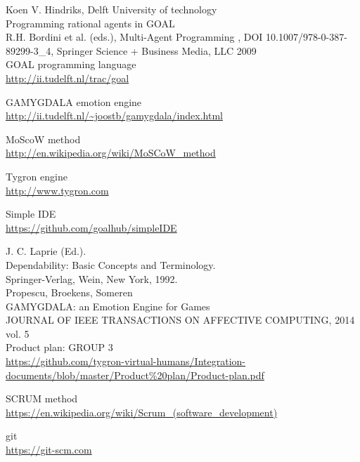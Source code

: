 \documentclass[11pt]{article}
\begin{document}
\clearpage

\printglossaries

\clearpage

\begin{thebibliography}{9}
	Koen V. Hindriks, Delft University of technology\\
	Programming rational agents in GOAL\\
	R.H. Bordini et al. (eds.), Multi-Agent Programming , DOI 10.1007/978-0-387-89299-3\_4, Springer Science + Business Media, LLC 2009 \\

	GOAL programming language\\
	\url{http://ii.tudelft.nl/trac/goal}
	
	GAMYGDALA emotion engine\\
	\url{http://ii.tudelft.nl/~joostb/gamygdala/index.html}
	
	MoScoW method\\
	\url{http://en.wikipedia.org/wiki/MoSCoW_method}
	
	Tygron engine\\
	\url{http://www.tygron.com}
	
	Simple IDE\\
	\url{https://github.com/goalhub/simpleIDE}
	
	J. C. Laprie (Ed.).\\ 
	Dependability: Basic Concepts and Terminology. \\
	Springer-Verlag, Wein, New York, 1992.\\

	Propescu, Broekens, Someren\\
	GAMYGDALA: an Emotion Engine for Games\\
	JOURNAL OF IEEE TRANSACTIONS ON AFFECTIVE COMPUTING, 2014 vol. 5\\

	Product plan: GROUP 3\\
	\url{https://github.com/tygron-virtual-humans/Integration-documents/blob/master/Product\%20plan/Product-plan.pdf}
	
	SCRUM method\\
	\url{https://en.wikipedia.org/wiki/Scrum_(software_development)}
	
	git\\
	\url{https://git-scm.com}
	

\end{thebibliography}
\end{document}
